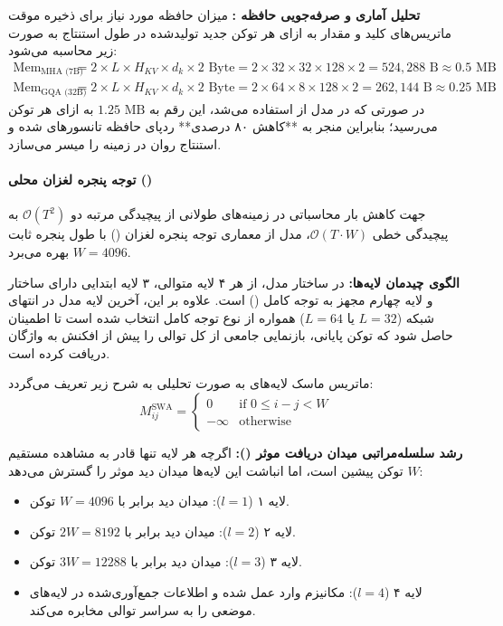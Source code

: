 \textbf{تحلیل آماری و صرفه‌جویی حافظه :}
میزان حافظه مورد نیاز برای ذخیره موقت ماتریس‌های کلید و مقدار به ازای هر توکن جدید تولیدشده در طول استنتاج به صورت زیر محاسبه می‌شود:
\begin{align}
    \text{Mem}_{\text{MHA (7B)}} &= 2 \times L \times H_{KV} \times d_k \times 2\text{ Byte} = 2 \times 32 \times 32 \times 128 \times 2 = 524{,}288 \text{ B} \approx 0.5 \text{ MB} \\
    \text{Mem}_{\text{GQA (32B)}} &= 2 \times L \times H_{KV} \times d_k \times 2\text{ Byte} = 2 \times 64 \times 8 \times 128 \times 2 = 262{,}144 \text{ B} \approx 0.25 \text{ MB}
\end{align}
در صورتی که در مدل  از  استفاده می‌شد، این رقم به $1.25\text{ MB}$ به ازای هر توکن می‌رسید؛ بنابراین  منجر به **کاهش ۸۰ درصدی** ردپای حافظه تانسورهای  شده و استنتاج روان در زمینه  را میسر می‌سازد.

\paragraph*{توجه پنجره لغزان محلی ()}
جهت کاهش بار محاسباتی در زمینه‌های طولانی از پیچیدگی مرتبه دو $\mathcal{O}(T^2)$ به پیچیدگی خطی $\mathcal{O}(T \cdot W)$، مدل  از معماری توجه پنجره لغزان () \cite{beltagy2020longformer} با طول پنجره ثابت $W = 4096$ بهره می‌برد.

\textbf{الگوی چیدمان لایه‌ها:}
در ساختار مدل، از هر ۴ لایه متوالی، ۳ لایه ابتدایی دارای ساختار  و لایه چهارم مجهز به توجه کامل () است. علاوه بر این، آخرین لایه مدل در انتهای شبکه ($L=32$ یا $L=64$) همواره از نوع توجه کامل انتخاب شده است تا اطمینان حاصل شود که توکن پایانی، بازنمایی جامعی از کل توالی را پیش از افکنش به واژگان دریافت کرده است.

ماتریس ماسک لایه‌های  به صورت تحلیلی به شرح زیر تعریف می‌گردد:
\begin{equation}
    M_{ij}^{\text{SWA}} = \begin{cases} 
        0 & \text{if } 0 \le i - j < W \\ 
        -\infty & \text{otherwise} 
    \end{cases}
\end{equation}

\textbf{رشد سلسله‌مراتبی میدان دریافت موثر ():}
اگرچه هر لایه  تنها قادر به مشاهده مستقیم $W$ توکن پیشین است، اما انباشت این لایه‌ها میدان دید موثر را گسترش می‌دهد:
\begin{itemize}
    \item لایه ۱ ($l=1$): میدان دید برابر با $W = 4096$ توکن.
    \item لایه ۲ ($l=2$): میدان دید برابر با $2W = 8192$ توکن.
    \item لایه ۳ ($l=3$): میدان دید برابر با $3W = 12288$ توکن.
    \item لایه ۴ ($l=4$): مکانیزم  وارد عمل شده و اطلاعات جمع‌آوری‌شده در لایه‌های موضعی را به سراسر توالی مخابره می‌کند.
\end{itemize}

